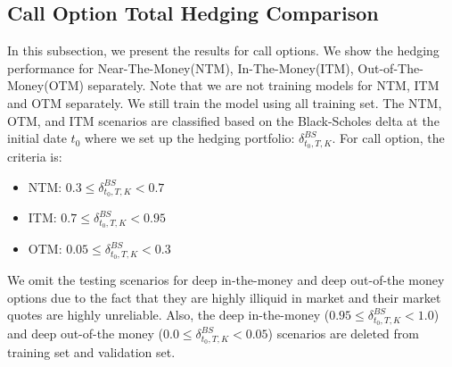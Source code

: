 \documentclass[letterpaper,12pt,titlepage,oneside,final]{book}
\numberwithin{equation}{section}
\theoremstyle{definition}
\begin{document}
\subsection{Call Option Total Hedging Comparison}
In this subsection, we present the results for call options. We show the hedging performance for Near-The-Money(NTM), In-The-Money(ITM), Out-of-The-Money(OTM) separately. Note that we are not training  models for NTM, ITM and OTM separately. We still train the model using all training set. The NTM, OTM, and ITM scenarios are classified based on the Black-Scholes delta at the initial date $t_0$ where we set up the hedging portfolio: $\delta^{BS}_{t_0,T,K}$. For call option, the criteria is:
\begin{itemize}
	\item  NTM: $0.3 \leq \delta^{BS}_{t_0,T,K} <0.7$
	\item  ITM: $0.7 \leq \delta^{BS}_{t_0,T,K} <0.95$
	\item  OTM:  $0.05 \leq \delta^{BS}_{t_0,T,K} <0.3$
\end{itemize}
We omit the testing scenarios for deep in-the-money and deep out-of-the money options due to the fact that they are highly illiquid in market and their market quotes are highly unreliable. Also, the deep in-the-money ($0.95 \leq \delta^{BS}_{t_0,T,K} <1.0$) and deep out-of-the money ($0.0 \leq \delta^{BS}_{t_0,T,K} <0.05$) scenarios are deleted from training set and validation set.
\end{document}
